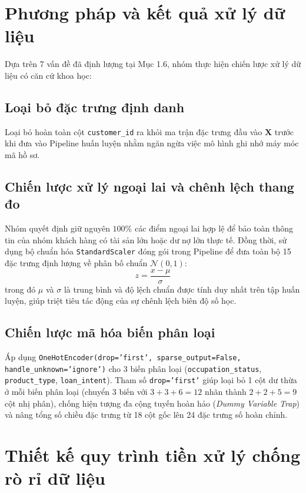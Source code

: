 \documentclass[12pt,a4paper,oneside]{report}
\begin{document}
\section{Phương pháp và kết quả xử lý dữ liệu}

Dựa trên 7 vấn đề đã định lượng tại Mục 1.6, nhóm thực hiện chiến lược xử lý dữ liệu có căn cứ khoa học:

\subsection{Loại bỏ đặc trưng định danh}
Loại bỏ hoàn toàn cột \texttt{customer\_id} ra khỏi ma trận đặc trưng đầu vào $\mathbf{X}$ trước khi đưa vào Pipeline huấn luyện nhằm ngăn ngừa việc mô hình ghi nhớ máy móc mã hồ sơ.

\subsection{Chiến lược xử lý ngoại lai và chênh lệch thang đo}
Nhóm quyết định giữ nguyên $100\%$ các điểm ngoại lai hợp lệ để bảo toàn thông tin của nhóm khách hàng có tài sản lớn hoặc dư nợ lớn thực tế. Đồng thời, sử dụng bộ chuẩn hóa \texttt{StandardScaler} đóng gói trong Pipeline để đưa toàn bộ 15 đặc trưng định lượng về phân bố chuẩn $\mathcal{N}(0, 1)$:
\begin{equation}
    z = \frac{x - \mu}{\sigma}
\end{equation}
trong đó $\mu$ và $\sigma$ là trung bình và độ lệch chuẩn được tính duy nhất trên tập huấn luyện, giúp triệt tiêu tác động của sự chênh lệch biên độ số học.

\subsection{Chiến lược mã hóa biến phân loại}
Áp dụng \texttt{OneHotEncoder(drop='first', sparse\_output=False, handle\_unknown='ignore')} cho 3 biến phân loại (\texttt{occupation\_status}, \texttt{product\_type}, \texttt{loan\_intent}). Tham số \texttt{drop='first'} giúp loại bỏ 1 cột dư thừa ở mỗi biến phân loại (chuyển 3 biến với $3+3+6=12$ nhãn thành $2+2+5=9$ cột nhị phân), chống hiện tượng đa cộng tuyến hoàn hảo (\textit{Dummy Variable Trap}) và nâng tổng số chiều đặc trưng từ 18 cột gốc lên 24 đặc trưng số hoàn chỉnh.

\section{Thiết kế quy trình tiền xử lý chống rò rỉ dữ liệu}
\end{document}
